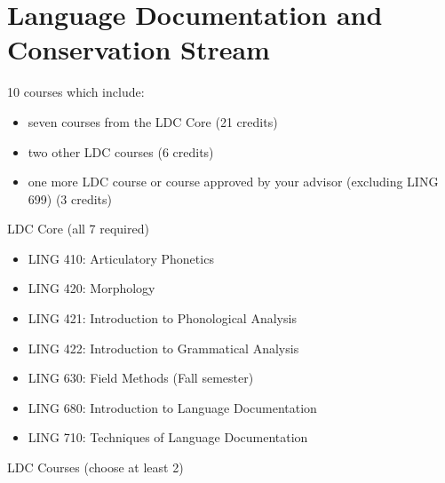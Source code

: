 \documentclass[
]{book}
\providecommand{\tightlist}{%
  \setlength{\itemsep}{0pt}\setlength{\parskip}{0pt}}
\begin{document}
\section{Language Documentation and Conservation Stream}\label{language-documentation-and-conservation-stream}

10 courses which include:

\begin{itemize}
\tightlist
\item
  seven courses from the LDC Core (21 credits)
\item
  two other LDC courses (6 credits)
\item
  one more LDC course or course approved by your advisor (excluding LING 699) (3 credits)
\end{itemize}

LDC Core (all 7 required)

\begin{itemize}
\tightlist
\item
  LING 410: Articulatory Phonetics
\item
  LING 420: Morphology
\item
  LING 421: Introduction to Phonological Analysis
\item
  LING 422: Introduction to Grammatical Analysis
\item
  LING 630: Field Methods (Fall semester)
\item
  LING 680: Introduction to Language Documentation
\item
  LING 710: Techniques of Language Documentation
\end{itemize}

LDC Courses (choose at least 2)
\end{document}
